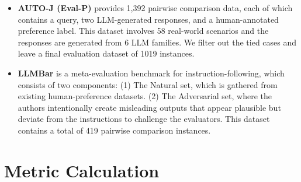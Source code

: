 \begin{itemize}
\item \textbf{AUTO-J (Eval-P)} \cite{li2024generative} provides 1,392 pairwise comparison data, each of which contains a query, two LLM-generated responses, and a human-annotated preference label. 
This dataset involves 58 real-world scenarios and the responses are generated from 6 LLM families. 
We filter out the tied cases and leave a final evaluation dataset of 1019 instances.

\item  \textbf{LLMBar} \cite{zeng2024llmbar} is a meta-evaluation benchmark for instruction-following, which consists of two components:
(1) The Natural set, which is gathered from existing human-preference datasets. 
(2) The Adversarial set, where the authors intentionally create misleading outputs that appear plausible but deviate from the instructions to challenge the evaluators.
This dataset contains a total of 419 pairwise comparison instances.

\end{itemize}

\section{Metric Calculation}
\label{appendix:correlation}
